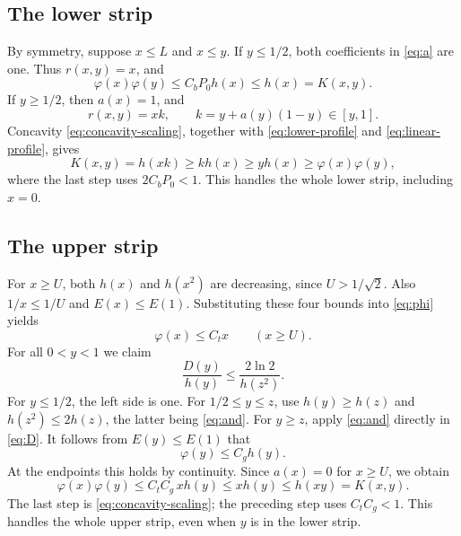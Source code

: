 \documentclass[11pt]{article}
\theoremstyle{remark}
\begin{document}
\subsection{The lower strip}
By symmetry, suppose \(x\le L\) and \(x\le y\).
If \(y\le1/2\), both coefficients in \eqref{eq:a} are one.
Thus \(r(x,y)=x\), and
\[
\varphi(x)\varphi(y)\le C_bP_0h(x)\le h(x)=K(x,y).
\]
If \(y\ge1/2\), then \(a(x)=1\), and
\[
r(x,y)=xk,\qquad k=y+a(y)(1-y)\in[y,1].
\]
Concavity \eqref{eq:concavity-scaling}, together with
\eqref{eq:lower-profile} and \eqref{eq:linear-profile}, gives
\[
K(x,y)=h(xk)\ge k h(x)\ge yh(x)
\ge\varphi(x)\varphi(y),
\]
where the last step uses \(2C_bP_0<1\).
This handles the whole lower strip, including \(x=0\).

\subsection{The upper strip}
For \(x\ge U\), both \(h(x)\) and \(h(x^2)\) are decreasing, since
\(U>1/\sqrt2\). Also \(1/x\le1/U\) and \(E(x)\le E(1)\).
Substituting these four bounds into \eqref{eq:phi} yields
\begin{equation}\label{eq:upper-linear}
\varphi(x)\le C_t x\qquad(x\ge U).
\end{equation}
For all \(0<y<1\) we claim
\[
\frac{D(y)}{h(y)}\le\frac{2\ln2}{h(z^2)}.
\]
For \(y\le1/2\), the left side is one.
For \(1/2\le y\le z\), use \(h(y)\ge h(z)\) and
\(h(z^2)\le2h(z)\), the latter being \eqref{eq:and}.
For \(y\ge z\), apply \eqref{eq:and} directly in \eqref{eq:D}.
It follows from \(E(y)\le E(1)\) that
\[
\varphi(y)\le C_g h(y).
\]
At the endpoints this holds by continuity. Since \(a(x)=0\) for
\(x\ge U\), we obtain
\[
\varphi(x)\varphi(y)\le C_tC_g\,xh(y)
\le xh(y)\le h(xy)=K(x,y).
\]
The last step is \eqref{eq:concavity-scaling}; the preceding step uses
\(C_tC_g<1\).
This handles the whole upper strip, even when \(y\) is in the
lower strip.
\end{document}
